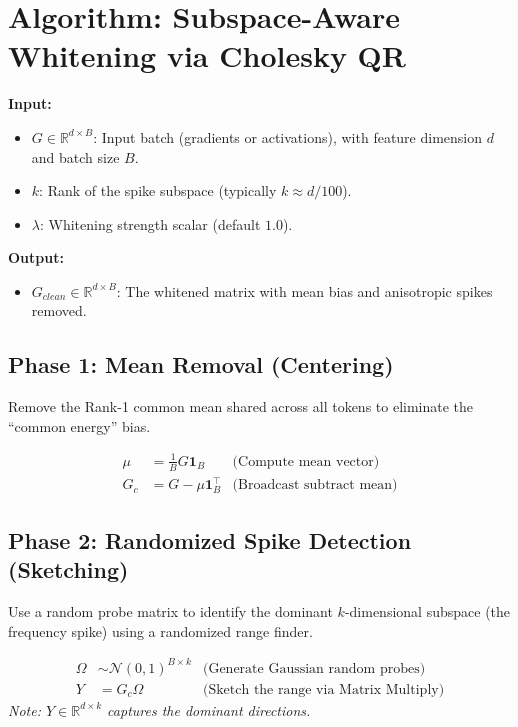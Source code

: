 \section{Algorithm: Subspace-Aware Whitening via Cholesky QR}

\textbf{Input:}
\begin{itemize}
    \item $G \in \mathbb{R}^{d \times B}$: Input batch (gradients or activations), with feature dimension $d$ and batch size $B$.
    \item $k$: Rank of the spike subspace (typically $k \approx d/100$).
    \item $\lambda$: Whitening strength scalar (default $1.0$).
\end{itemize}

\textbf{Output:}
\begin{itemize}
    \item $G_{clean} \in \mathbb{R}^{d \times B}$: The whitened matrix with mean bias and anisotropic spikes removed.
\end{itemize}

\subsection*{Phase 1: Mean Removal (Centering)}
Remove the Rank-1 common mean shared across all tokens to eliminate the ``common energy'' bias.

\begin{align}
    \mu &= \frac{1}{B} G \mathbf{1}_B & \text{(Compute mean vector)} \\
    G_c &= G - \mu \mathbf{1}_B^\top & \text{(Broadcast subtract mean)}
\end{align}

\subsection*{Phase 2: Randomized Spike Detection (Sketching)}
Use a random probe matrix to identify the dominant $k$-dimensional subspace (the frequency spike) using a randomized range finder.

\begin{align}
    \Omega &\sim \mathcal{N}(0, 1)^{B \times k} & \text{(Generate Gaussian random probes)} \\
    Y &= G_c \Omega & \text{(Sketch the range via Matrix Multiply)}
\end{align}
\textit{Note: $Y \in \mathbb{R}^{d \times k}$ captures the dominant directions.}

